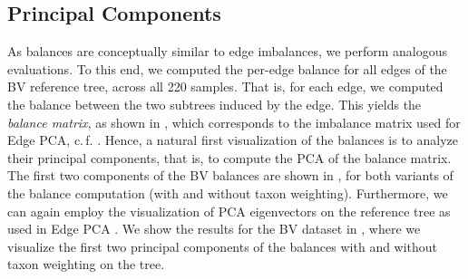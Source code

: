 
\subsection{Principal Components}
\label{ch:Balances:sec:Results:sub:PrincipalComponents}

As balances are conceptually similar to edge imbalances, we perform analogous evaluations.
To this end, we computed the per-edge balance for all edges of the \ac{BV} reference tree, across all \num{220} samples.
That is, for each edge, we computed the balance between the two subtrees induced by the edge.
This yields the \emph{balance matrix}, as shown in ,
which corresponds to the imbalance matrix used for Edge PCA, c.\,f. .
Hence, a natural first visualization of the balances is to analyze their principal components,
that is, to compute the PCA of the balance matrix.
The first two components of the \ac{BV} balances are shown in ,
for both variants of the balance computation (with and without taxon weighting).
Furthermore,
we can again employ the visualization of PCA eigenvectors on the reference tree as used in Edge PCA \cite{Matsen2011a}.
We show the results for %
the \ac{BV} dataset in ,
where we visualize the first two principal components of the balances with and without taxon weighting on the tree.

